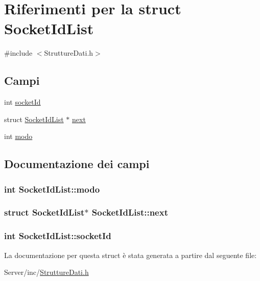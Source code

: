 \hypertarget{structSocketIdList}{}\section{Riferimenti per la struct Socket\+Id\+List}
\label{structSocketIdList}


{\ttfamily \#include $<$Strutture\+Dati.\+h$>$}

\subsection*{Campi}
\begin{DoxyCompactItemize}
\item 
int \hyperlink{structSocketIdList_ae3472c269defc3b5c5158bb23316989d}{socket\+Id}
\item 
struct \hyperlink{structSocketIdList}{Socket\+Id\+List} $\ast$ \hyperlink{structSocketIdList_a6a4ac9d91704e30a162d520bca97a270}{next}
\item 
int \hyperlink{structSocketIdList_a84ef1b1879e61c17fe09e27e2038d0ee}{modo}
\end{DoxyCompactItemize}


\subsection{Documentazione dei campi}
\hypertarget{structSocketIdList_a84ef1b1879e61c17fe09e27e2038d0ee}{}
\subsubsection[{modo}]{\setlength{\rightskip}{0pt plus 5cm}int Socket\+Id\+List\+::modo}\label{structSocketIdList_a84ef1b1879e61c17fe09e27e2038d0ee}
\hypertarget{structSocketIdList_a6a4ac9d91704e30a162d520bca97a270}{}
\subsubsection[{next}]{\setlength{\rightskip}{0pt plus 5cm}struct {\bf Socket\+Id\+List}$\ast$ Socket\+Id\+List\+::next}\label{structSocketIdList_a6a4ac9d91704e30a162d520bca97a270}
\hypertarget{structSocketIdList_ae3472c269defc3b5c5158bb23316989d}{}
\subsubsection[{socket\+Id}]{\setlength{\rightskip}{0pt plus 5cm}int Socket\+Id\+List\+::socket\+Id}\label{structSocketIdList_ae3472c269defc3b5c5158bb23316989d}


La documentazione per questa struct è stata generata a partire dal seguente file\+:\begin{DoxyCompactItemize}
\item 
Server/inc/\hyperlink{StruttureDati_8h}{Strutture\+Dati.\+h}\end{DoxyCompactItemize}
